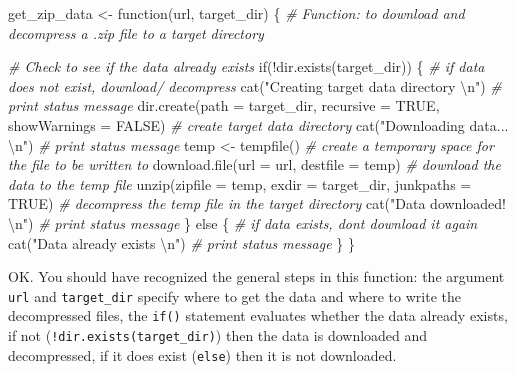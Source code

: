 \documentclass[
  letterpaper,
]{scrbook}
\newenvironment{Shaded}{\begin{snugshade}}{\end{snugshade}}
\newcommand{\AttributeTok}[1]{\textcolor[rgb]{0.00,0.00,0.00}{#1}}
\newcommand{\CommentTok}[1]{\textcolor[rgb]{0.00,0.00,0.00}{\textit{#1}}}
\newcommand{\ConstantTok}[1]{\textcolor[rgb]{0.00,0.00,0.00}{#1}}
\newcommand{\ControlFlowTok}[1]{\textcolor[rgb]{0.00,0.00,0.00}{#1}}
\newcommand{\FunctionTok}[1]{\textcolor[rgb]{0.00,0.00,0.00}{#1}}
\newcommand{\NormalTok}[1]{\textcolor[rgb]{0.00,0.00,0.00}{#1}}
\newcommand{\OtherTok}[1]{\textcolor[rgb]{0.00,0.00,0.00}{#1}}
\newcommand{\SpecialCharTok}[1]{\textcolor[rgb]{0.00,0.00,0.00}{#1}}
\newcommand{\StringTok}[1]{\textcolor[rgb]{0.00,0.00,0.00}{#1}}
\begin{document}
\begin{Shaded}
\begin{Highlighting}[]
\NormalTok{get\_zip\_data }\OtherTok{\textless{}{-}} \ControlFlowTok{function}\NormalTok{(url, target\_dir) \{}
  \CommentTok{\# Function: to download and decompress a .zip file to a target directory}
  
  \CommentTok{\# Check to see if the data already exists}
  \ControlFlowTok{if}\NormalTok{(}\SpecialCharTok{!}\FunctionTok{dir.exists}\NormalTok{(target\_dir)) \{ }\CommentTok{\# if data does not exist, download/ decompress}
    \FunctionTok{cat}\NormalTok{(}\StringTok{"Creating target data directory }\SpecialCharTok{\textbackslash{}n}\StringTok{"}\NormalTok{) }\CommentTok{\# print status message}
    \FunctionTok{dir.create}\NormalTok{(}\AttributeTok{path =}\NormalTok{ target\_dir, }\AttributeTok{recursive =} \ConstantTok{TRUE}\NormalTok{, }\AttributeTok{showWarnings =} \ConstantTok{FALSE}\NormalTok{) }\CommentTok{\# create target data directory}
    \FunctionTok{cat}\NormalTok{(}\StringTok{"Downloading data... }\SpecialCharTok{\textbackslash{}n}\StringTok{"}\NormalTok{) }\CommentTok{\# print status message}
\NormalTok{    temp }\OtherTok{\textless{}{-}} \FunctionTok{tempfile}\NormalTok{() }\CommentTok{\# create a temporary space for the file to be written to}
    \FunctionTok{download.file}\NormalTok{(}\AttributeTok{url =}\NormalTok{ url, }\AttributeTok{destfile =}\NormalTok{ temp) }\CommentTok{\# download the data to the temp file}
    \FunctionTok{unzip}\NormalTok{(}\AttributeTok{zipfile =}\NormalTok{ temp, }\AttributeTok{exdir =}\NormalTok{ target\_dir, }\AttributeTok{junkpaths =} \ConstantTok{TRUE}\NormalTok{) }\CommentTok{\# decompress the temp file in the target directory}
    \FunctionTok{cat}\NormalTok{(}\StringTok{"Data downloaded! }\SpecialCharTok{\textbackslash{}n}\StringTok{"}\NormalTok{) }\CommentTok{\# print status message}
\NormalTok{  \} }\ControlFlowTok{else}\NormalTok{ \{ }\CommentTok{\# if data exists, don\textquotesingle{}t download it again}
    \FunctionTok{cat}\NormalTok{(}\StringTok{"Data already exists }\SpecialCharTok{\textbackslash{}n}\StringTok{"}\NormalTok{) }\CommentTok{\# print status message}
\NormalTok{  \}}
\NormalTok{\}}
\end{Highlighting}
\end{Shaded}

OK. You should have recognized the general steps in this function: the
argument \texttt{url} and \texttt{target\_dir} specify where to get the
data and where to write the decompressed files, the \texttt{if()}
statement evaluates whether the data already exists, if not
(\texttt{!dir.exists(target\_dir)}) then the data is downloaded and
decompressed, if it does exist (\texttt{else}) then it is not
downloaded.
\end{document}
